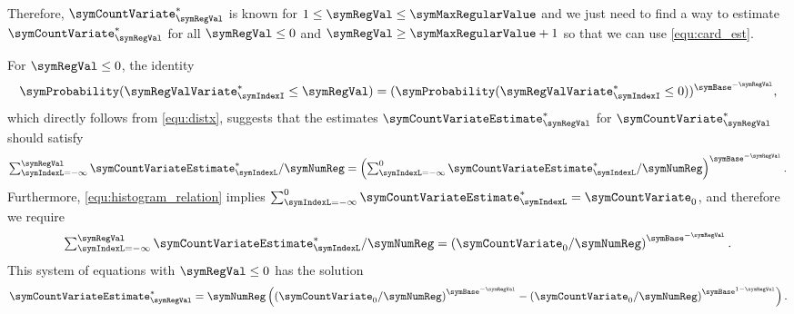 \documentclass[sigconf, nonacm]{acmart}
\begin{document}
Therefore, $\symCountVariate^{*}_\symRegVal$ is known for $1\leq \symRegVal\leq \symMaxRegularValue$ and we just need to find a way to estimate $\symCountVariate^{*}_\symRegVal$ for all $\symRegVal\leq 0$ and $\symRegVal\geq \symMaxRegularValue+1$ so that we can use \eqref{equ:card_est}. 

For $\symRegVal\leq 0$, the identity 
\begin{equation*}
\symProbability(\symRegValVariate_\symIndexI^{*} \leq \symRegVal)
 =
 (
 \symProbability(\symRegValVariate_\symIndexI^{*} \leq 0)
 )^{\symBase^{-\symRegVal}},
 \end{equation*}
which directly follows from \eqref{equ:distx}, suggests that the estimates $\symCountVariateEstimate^{*}_\symRegVal$ for $\symCountVariate^{*}_\symRegVal$ should satisfy
\begin{equation*}
\textstyle\sum_{\symIndexL=-\infty}^\symRegVal \symCountVariateEstimate^{*}_\symIndexL/\symNumReg
=
\left(\sum_{\symIndexL=-\infty}^0 \symCountVariateEstimate^{*}_\symIndexL/\symNumReg\right)^{\symBase^{-\symRegVal}}.
\end{equation*}
Furthermore, \eqref{equ:histogram_relation} implies $\sum_{\symIndexL=-\infty}^0 \symCountVariateEstimate^{*}_\symIndexL = \symCountVariate_0$, and therefore we require
\begin{equation*}
\textstyle\sum_{\symIndexL=-\infty}^\symRegVal \symCountVariateEstimate^{*}_\symIndexL/\symNumReg
=
\left(\symCountVariate_{0}/\symNumReg\right)^{\symBase^{-\symRegVal}}.
\end{equation*}
This system of equations with $\symRegVal\leq 0$ has the solution 
\begin{equation*}
\symCountVariateEstimate^{*}_\symRegVal = \symNumReg\left(\left(\symCountVariate_0/\symNumReg\right)^{\symBase^{-\symRegVal}}-\left(\symCountVariate_0/\symNumReg\right)^{\symBase^{1-\symRegVal}}\right).
\end{equation*}
\end{document}
